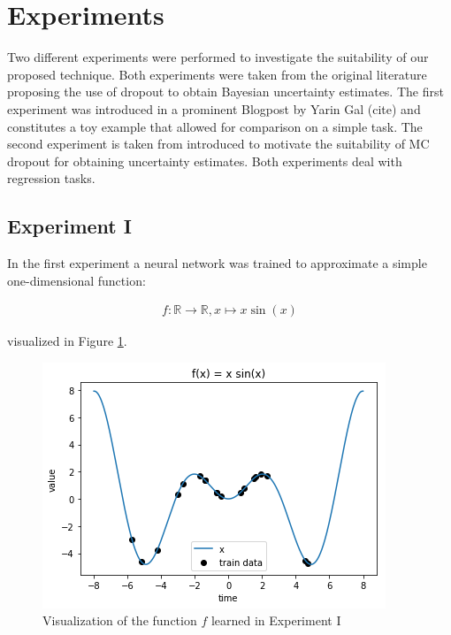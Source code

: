 \documentclass[10pt,a4paper,twocolumn]{article}
\begin{document}
\section{Experiments}
Two different experiments were performed to investigate the suitability of our proposed technique. Both experiments were taken from the original literature proposing the use of dropout to obtain Bayesian uncertainty estimates. The first experiment was introduced in a prominent Blogpost by Yarin Gal (cite) and constitutes a toy example that allowed for comparison on a simple task. The second experiment is taken from \cite{gal2016dropout} introduced to motivate the suitability of MC dropout for obtaining uncertainty estimates. Both experiments deal with regression tasks. 

\subsection{Experiment I} In the first experiment a neural network was trained to approximate a simple one-dimensional function:

\begin{align}
f: \mathds{R} \to \mathds{R}, x \mapsto x\sin{(x)}
\end{align}

visualized in Figure \ref{fig:exp1_func}.

\begin{figure}
\centering
\includegraphics[width=\linewidth]{function.png}
\caption{Visualization of the function $f$ learned in Experiment I}\label{fig:exp1_func}
\end{figure}
\end{document}
